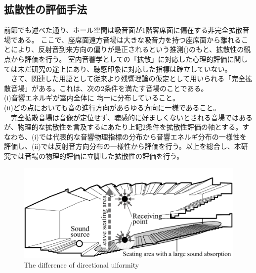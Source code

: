 \subsection{拡散性の評価手法}
前節でも述べた通り、ホール空間は吸音面が1階客席面に偏在する非完全拡散音場である。
ここで、座席面遠方音場は大きな吸音力を持つ座席面から離れることにより、反射音到来方向の偏りが是正されるという推測()のもと、拡散性の観点から評価を行う。
室内音響学としての「拡散」に対応した心理的評価に関しては未だ研究の途上にあり、聴感印象に対応した指標は確立していない。
\\　さて、関連した用語として従来より残響理論の仮定として用いられる「完全拡散音場」がある。これは、次の2条件を満たす音場のことである。
\\(i)音響エネルギが室内全体に 均一に分布していること。
\\(i\hspace{-.05em}i)どの点においても音の進行方向があらゆる方向に一様であること。
\\　完全拡散音場は音像が定位せず、聴感的に好ましくないとされる音場ではあるが、物理的な拡散性を言及するにあたり上記2条件を拡散性評価の軸とする。すなわち、(i)では代表的な音響物理指標の分布から音響エネルギ分布の一様性を評価し、(ii)では反射音方向分布の一様性から評価を行う。以上を総合し、本研究では音場の物理的評価に立脚した拡散性の評価を行う。
\vspace{0.8cm}
\begin{figure}[htbp]
    \centering
    \includegraphics[keepaspectratio,scale=0.8]{01_att/far_improve.pdf}
    \caption{\hspace{1mm}The difference of directional uiformity}
    \label{fig:far_improve}
\end{figure}


\pagebreak
